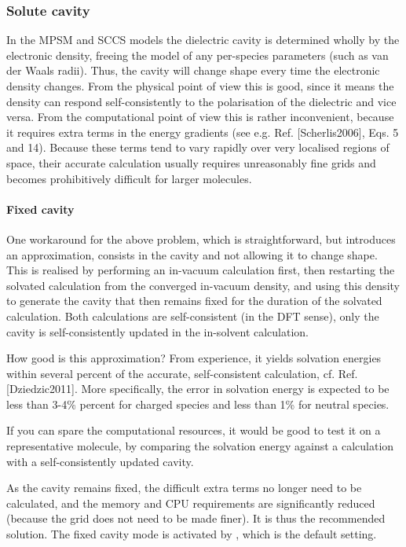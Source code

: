 \documentclass[letterpaper,10pt,english]{sphinxmanual}
\begin{document}
\subsubsection{Solute cavity}
\label{\detokenize{implicit_solvation_v3:solute-cavity}}
In the MPSM and SCCS models the dielectric cavity is determined wholly
by the electronic density, freeing the model of any per-species
parameters (such as van der Waals radii). Thus, the cavity will change
shape every time the electronic density changes. From the physical point
of view this is good, since it means the density can respond
self-consistently to the polarisation of the dielectric and vice versa.
From the computational point of view this is rather inconvenient,
because it requires extra terms in the energy gradients (see e.g. Ref. {[}Scherlis2006{]},
Eqs. 5 and 14). Because these terms tend to vary rapidly over very
localised regions of space, their accurate calculation usually requires
unreasonably fine grids and becomes prohibitively difficult for larger
molecules.


\paragraph{Fixed cavity}
\label{\detokenize{implicit_solvation_v3:fixed-cavity}}
One workaround for the above problem, which is straightforward, but
introduces an approximation, consists in  the cavity and not
allowing it to change shape. This is realised by performing an in-vacuum
calculation first, then restarting the solvated calculation from the
converged in-vacuum density, and using this density to generate the
cavity that then remains fixed for the duration of the solvated
calculation. Both calculations are self-consistent (in the DFT sense),
only the cavity is  self-consistently updated in the in-solvent
calculation.

How good is this approximation? From experience, it yields solvation
energies within several percent of the accurate, self-consistent
calculation, cf. Ref. {[}Dziedzic2011{]}. More specifically, the error in solvation energy
is expected to be less than 3-4\% percent for charged species and less
than 1\% for neutral species.

If you can spare the computational resources, it would be good to test
it on a representative molecule, by comparing the solvation energy
against a calculation with a self-consistently updated cavity.

As the cavity remains fixed, the difficult extra terms no longer need to
be calculated, and the memory and CPU requirements are significantly
reduced (because the grid does not need to be made finer). It is thus
the recommended solution. The fixed cavity mode is activated by
, which is the default setting.
\end{document}
